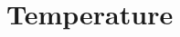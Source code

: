 \documentclass[12pt,oneside]{book}
\begin{document}
% 
% 

\section{Temperature}
\label{sec:temperature}


%  
% 

%  
% 

\end{document}
